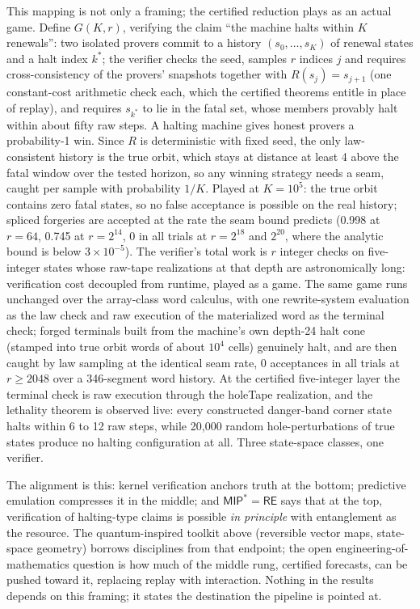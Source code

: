 \documentclass[11pt]{article}
\begin{document}
This mapping is not only a framing; the certified reduction plays as
an actual game. Define $G(K, r)$, verifying the claim ``the machine
halts within $K$ renewals'': two isolated provers commit to a
history $(s_0, \ldots, s_K)$ of renewal states and a halt index
$k^*$; the verifier checks the seed, samples $r$ indices $j$ and
requires cross-consistency of the provers' snapshots together with
$R(s_j) = s_{j+1}$ (one constant-cost arithmetic check each, which
the certified theorems entitle in place of replay), and requires
$s_{k^*}$ to lie in the fatal set, whose members provably halt
within about fifty raw steps. A halting machine gives honest provers
a probability-1 win. Since $R$ is deterministic with fixed seed, the
only law-consistent history is the true orbit, which stays at
distance at least 4 above the fatal window over the tested horizon,
so any winning strategy needs a seam, caught per sample with
probability $1/K$. Played at $K = 10^5$: the true orbit contains
zero fatal states, so no false acceptance is possible on the real
history; spliced forgeries are accepted at the rate the seam bound
predicts (0.998 at $r = 64$, 0.745 at $r = 2^{14}$, 0 in all trials
at $r = 2^{18}$ and $2^{20}$, where the analytic bound is below
$3 \times 10^{-5}$). The verifier's total work is $r$ integer
checks on five-integer states whose raw-tape realizations at that
depth are astronomically long: verification cost decoupled from
runtime, played as a game. The same game runs unchanged over the
array-class word calculus, with one rewrite-system evaluation as the
law check and raw execution of the materialized word as the terminal
check; forged terminals built from the machine's own depth-24 halt
cone (stamped into true orbit words of about $10^4$ cells) genuinely
halt, and are then caught by law sampling at the identical seam
rate, 0 acceptances in all trials at $r \ge 2048$ over a
346-segment word history. At the certified five-integer layer the
terminal check is raw execution through the holeTape realization,
and the lethality theorem is observed live: every constructed
danger-band corner state halts within 6 to 12 raw steps, while
20{,}000 random hole-perturbations of true states produce no halting
configuration at all. Three state-space classes, one verifier.

The alignment is this: kernel verification anchors
truth at the bottom; predictive emulation compresses it in the middle;
and $\mathsf{MIP}^{*} = \mathsf{RE}$ says that at the top,
verification of halting-type claims is possible \emph{in principle}
with entanglement as the resource. The quantum-inspired toolkit
above
(reversible vector maps, state-space geometry) borrows disciplines
from that endpoint; the open engineering-of-mathematics question is
how much of the middle rung, certified forecasts, can be pushed
toward it, replacing replay with interaction. Nothing in the
results
depends on this framing; it states the destination the pipeline is
pointed at.
\end{document}
